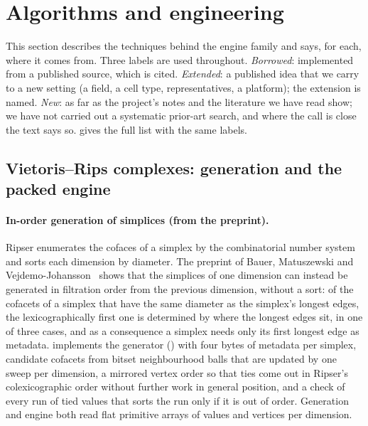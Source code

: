 \section{Algorithms and engineering}\label{sec:algorithms}

This section describes the techniques behind the engine family and says, for each, where it comes from. Three labels are used
throughout. \emph{Borrowed}: implemented from a published source, which is cited. \emph{Extended}: a published idea
that we carry to a new setting (a field, a cell type, representatives, a platform); the extension is named. \emph{New}: as far as
the project's notes and the literature we have read show; we have not carried out a systematic prior-art search, and where the
call is close the text says so.  gives the full list with the same labels.

\subsection{Vietoris--Rips complexes: generation and the packed engine}\label{sec:vr}

\paragraph{In-order generation of simplices (from the preprint).}
Ripser enumerates the cofaces of a simplex by the combinatorial number system and sorts each dimension by diameter. The
preprint of Bauer, Matuszewski and Vejdemo-Johansson~\cite{bauer2024generating} shows that the simplices of one dimension can
instead be generated in filtration order from the previous dimension, without a sort: of the cofacets of a simplex that
have the same diameter as the simplex's longest edges, the lexicographically first one is determined by where the
longest edges sit, in one of three cases, and as a consequence a simplex needs only its first longest edge as metadata.
\tdaj{} implements the generator () with four bytes of metadata per simplex, candidate
cofacets from bitset neighbourhood balls that are updated by one sweep per dimension, a mirrored vertex order so that ties come
out in Ripser's colexicographic order without further work in general position, and a check of every run of tied values that sorts the run only if it is out of order.
Generation and engine both read flat primitive arrays of values and vertices per dimension.

